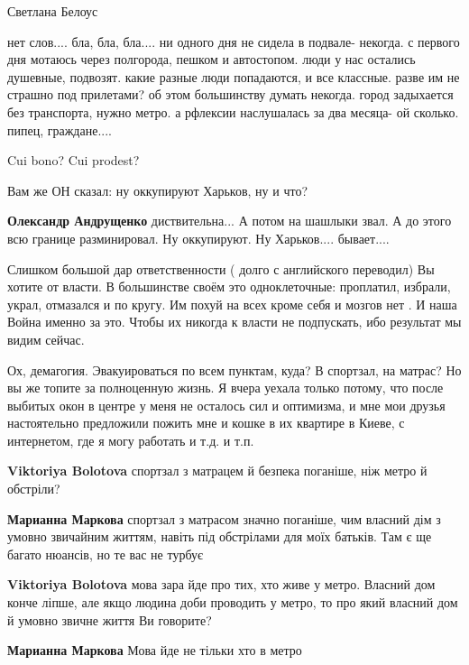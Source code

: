 \begin{itemize}
Светлана Белоус

нет слов.... бла, бла, бла.... ни одного дня не сидела в подвале- некогда. с первого
дня мотаюсь через полгорода, пешком и автостопом. люди у нас остались
душевные, подвозят. какие разные люди попадаются, и все классные. разве им не
страшно под прилетами? об этом большинству думать некогда. город задыхается без
транспорта, нужно метро. а рфлексии наслушалась за два месяца- ой
сколько. пипец, граждане....

Cui bono? Cui prodest?

Вам же ОН сказал: ну оккупируют Харьков, ну и что?

\textbf{Олександр Андрущенко} диствительна...
А потом на шашлыки звал.
А до этого всю границе разминировал.
Ну оккупируют. Ну Харьков.... бывает....


Слишком большой дар ответственности ( долго с английского переводил) Вы хотите
от власти. В большинстве своём это одноклеточные: проплатил, избрали, украл,
отмазался и по кругу. Им похуй на всех кроме себя и мозгов нет . И наша Война
именно за это. Чтобы их никогда к власти не подпускать, ибо результат мы видим
сейчас.


Ох, демагогия. Эвакуироваться по всем пунктам, куда? В спортзал, на матрас? Но
вы же топите за полноценную жизнь. Я вчера уехала только потому, что после
выбитых окон в центре у меня не осталось сил и оптимизма, и мне мои друзья
настоятельно предложили пожить мне и кошке в их квартире в Киеве, с интернетом,
где я могу работать и т.д. и т.п.

\begin{itemize} %
\textbf{Viktoriya Bolotova} спортзал з матрацем й безпека поганіше, ніж метро й обстріли?

\textbf{Марианна Маркова} спортзал з матрасом значно поганіше, чим власний дім з умовно звичайним життям, навіть під обстрілами для моїх батьків. Там є ще багато нюансів, но те вас не турбує

\textbf{Viktoriya Bolotova} мова зара йде про тих, хто живе у метро. Власний дом конче ліпше, але якщо людина доби проводить у метро, то про який власний дом й умовно звичне життя Ви говорите?

\textbf{Марианна Маркова} Мова йде не тільки хто в метро


\end{itemize}
\end{itemize}
